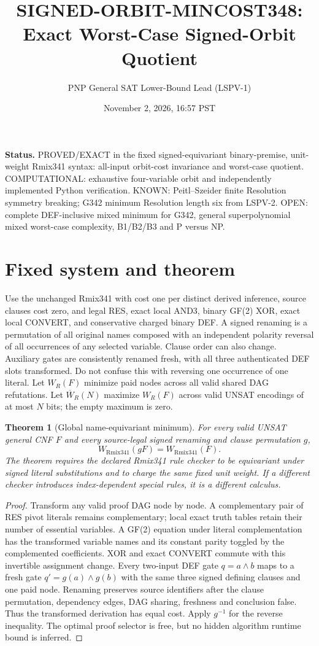 \documentclass{article}
\title{SIGNED-ORBIT-MINCOST348: Exact Worst-Case Signed-Orbit Quotient}
\author{PNP General SAT Lower-Bound Lead (LSPV-1)}
\date{November 2, 2026, 16:57 PST}
\newtheorem{theorem}{Theorem}
\begin{document}
\maketitle
\noindent\textbf{Status.} PROVED/EXACT in the fixed signed-equivariant binary-premise, unit-weight Rmix341 syntax: all-input orbit-cost invariance and worst-case quotient. COMPUTATIONAL: exhaustive four-variable orbit and independently implemented Python verification. KNOWN: Peitl--Szeider finite Resolution symmetry breaking; G342 minimum Resolution length six from LSPV-2. OPEN: complete DEF-inclusive mixed minimum for G342, general superpolynomial mixed worst-case complexity, B1/B2/B3 and P versus NP.

\section*{Fixed system and theorem}
Use the unchanged Rmix341 with cost one per distinct derived inference, source clauses cost zero, and legal RES, exact local AND3, binary GF(2) XOR, exact local CONVERT, and conservative charged binary DEF. A signed renaming is a permutation of all original names composed with an independent polarity reversal of all occurrences of any selected variable. Clause order can also change. Auxiliary gates are consistently renamed fresh, with all three authenticated DEF slots transformed. Do not confuse this with reversing one occurrence of one literal. Let $W_R(F)$ minimize paid nodes across all valid shared DAG refutations. Let $\overline W_R(N)$ maximize $W_R(F)$ across valid UNSAT encodings of at most $N$ bits; the empty maximum is zero.

\begin{theorem}[Global name-equivariant minimum]
For every valid UNSAT general CNF $F$ and every source-legal signed renaming and clause permutation $g$,
\[
 W_{\mathrm{Rmix341}}(gF)=W_{\mathrm{Rmix341}}(F).
\]
The theorem requires the declared Rmix341 rule checker to be equivariant under signed literal substitutions and to charge the same fixed unit weight. If a different checker introduces index-dependent special rules, it is a different calculus.
\end{theorem}
\begin{proof}
Transform any valid proof DAG node by node. A complementary pair of RES pivot literals remains complementary; local exact truth tables retain their number of essential variables. A GF(2) equation under literal complementation has the transformed variable names and its constant parity toggled by the complemented coefficients. XOR and exact CONVERT commute with this invertible assignment change. Every two-input DEF gate $q=a\wedge b$ maps to a fresh gate $q'=g(a)\wedge g(b)$ with the same three signed defining clauses and one paid node. Renaming preserves source identifiers after the clause permutation, dependency edges, DAG sharing, freshness and conclusion false. Thus the transformed derivation has equal cost. Apply $g^{-1}$ for the reverse inequality. The optimal proof selector is free, but no hidden algorithm runtime bound is inferred.
\end{proof}
\end{document}
